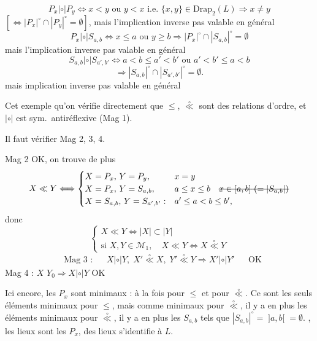 \documentclass[11pt,a4paper]{article}
\begin{document}
\[
P_x \mathrel{|{\circ}|} P_y \Longleftrightarrow x<y \text{ ou } y<x \text{ i.e. } \{x,y\}\in\mathrm{Drap}_2(L) \Longrightarrow x\neq y
\]
$[\Longleftrightarrow |P_x|^\circ \cap |P_y|^\circ = \emptyset]$, mais l'implication inverse pas valable en général
\[
P_x \mathrel{|{\circ}|} S_{a,b} \Longleftrightarrow x\le a \text{ ou } y\ge b \Longrightarrow |P_x|^\circ\cap|S_{a,b}|^\circ = \emptyset
\]
mais l'implication inverse pas valable en général
\[
S_{a,b} \mathrel{|{\circ}|} S_{a',b'} \Longleftrightarrow a<b\le a'<b' \text{ ou } a'<b'\le a<b
\]
\[
\Longrightarrow |S_{a,b}|^\circ \cap |S_{a',b'}|^\circ = \emptyset .
\]
mais implication inverse pas valable en général

Cet exemple qu'on vérifie directement que $\le$, $\overset{\circ}{\ll}$ sont des relations d'ordre, et $|{\circ}|$ est sym.\ antiréflexive (Mag 1).

Il faut vérifier Mag 2, 3, 4.

Mag 2 OK, on trouve de plus
\[
X \ll Y \Longleftrightarrow
\begin{cases}
X = P_x,\, Y = P_y, & x = y\\
X = P_x,\, Y = S_{a,b}, & a\le x\le b \quad \text{\struck{$x\in[a,b]$ ($=|S_{a,b}|$)}}\\
X = S_{a,b},\, Y = S_{a',b'} : & a'\le a<b\le b' ,
\end{cases}
\]
donc
\[
\begin{cases}
X \ll Y \Longleftrightarrow |X|\subset|Y|\\
\text{si } X,Y\in\mathcal{M}_1, \quad X\ll Y \Longleftrightarrow X \overset{\circ}{\ll} Y
\end{cases}
\]
\[
\begin{aligned}
&\text{Mag 3 :} && X \mathrel{|{\circ}|} Y,\; X'\overset{\circ}{\ll}X,\; Y'\overset{\circ}{\ll}Y \Longrightarrow X'\mathrel{|{\circ}|}Y' && \text{OK}
\end{aligned}
\]
Mag 4 : $X$ \ill{} $Y_0 \Longrightarrow X \mathrel{|{\circ}|} Y$ OK

Ici encore, les $P_x$ sont  minimaux : à la fois pour $\le$ et pour $\overset{\circ}{\ll}$. Ce sont les seuls éléments minimaux pour $\le$, \struck{\ill{}} mais comme minimaux pour $\overset{\circ}{\ll}$, il y a en plus les éléments minimaux pour $\overset{\circ}{\ll}$, il y a en plus les $S_{a,b}$ tels que $|S_{a,b}|^\circ = \;]a,b[\; = \emptyset$. , les lieux sont les $P_x$,  des lieux s'identifie à $L$.
\end{document}
